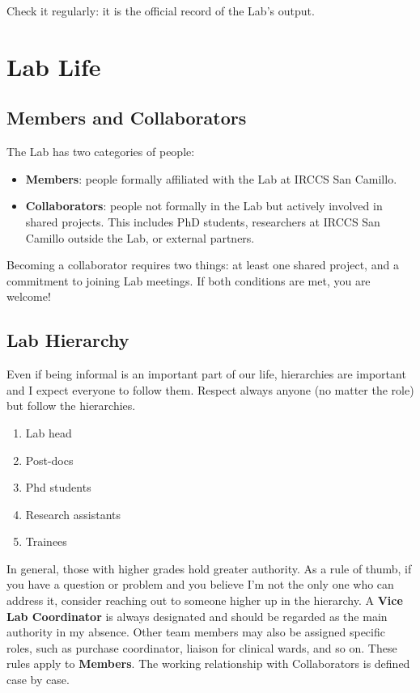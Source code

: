 \documentclass[12pt]{article}
\begin{document}
Check it regularly: it is the official record of the Lab's output.

\section{Lab Life}
\subsection{Members and Collaborators}

The Lab has two categories of people:

\begin{itemize}
    \item \textbf{Members}: people formally affiliated with the Lab 
    at IRCCS San Camillo.
    \item \textbf{Collaborators}: people not formally in the Lab but 
    actively involved in shared projects. This includes PhD students, 
    researchers at IRCCS San Camillo outside the Lab, or external 
    partners.
\end{itemize}

Becoming a collaborator requires two things: at least one shared 
project, and a commitment to joining Lab meetings. If both conditions 
are met, you are welcome! 

\subsection{Lab Hierarchy}
Even if being informal is an important part of our life, hierarchies are important and I expect everyone to follow them. Respect always anyone (no matter the role) but follow the hierarchies. 
\begin{enumerate}
\item Lab head
\item Post-docs
\item Phd students
\item Research assistants
\item Trainees
\end{enumerate}

In general, those with higher grades hold greater authority. As a rule of thumb, if you have a question or problem and you believe I'm not the only one who can address it, consider reaching out to someone higher up in the hierarchy.
A \textbf{Vice Lab Coordinator} is always designated and should be regarded as the main authority in my absence. Other team members may also be assigned specific roles, such as purchase coordinator, liaison for clinical wards, and so on.
These rules apply to \textbf{Members}. The working relationship with Collaborators is defined case by case.
\end{document}
